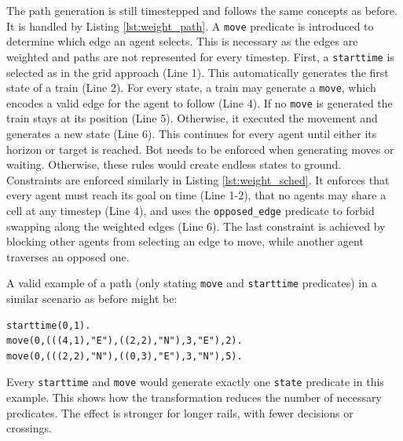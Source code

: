 \documentclass{llncs}
\begin{document}
\begin{multicols*}{2}
The path generation is still timestepped and follows the same concepts as before. It is handled by Listing \ref{lst:weight_path}. A \texttt{move} predicate is introduced to determine which edge an agent selects. This is necessary as the edges are weighted and paths are not represented for every timestep. First, a \texttt{starttime} is selected as in the grid approach (Line 1). This automatically generates the first state of a train (Line 2). For every state, a train may generate a \texttt{move}, which encodes a valid edge for the agent to follow (Line 4). If no \texttt{move} is generated the train stays at its position (Line 5). Otherwise, it executed the movement and generates a new state (Line 6). This continues for every agent until either its horizon or target is reached. Bot needs to be enforced when generating moves or waiting. Otherwise, these rules would create endless states to ground.\\

Constraints are enforced similarly in Listing \ref{lst:weight_sched}. It enforces that every agent must reach its goal on time (Line 1-2), that no agents may share a cell at any timestep (Line 4), and uses the \texttt{opposed\_edge} predicate to forbid swapping along the weighted edges (Line 6). The last constraint is achieved by blocking other agents from selecting an edge to move, while another agent traverses an opposed one.

A valid example of a path (only stating \texttt{move} and \texttt{starttime} predicates) in a similar scenario as before might be:

\begin{verbatim}
starttime(0,1).
move(0,(((4,1),"E"),((2,2),"N"),3,"E"),2).
move(0,(((2,2),"N"),((0,3),"E"),3,"N"),5).
\end{verbatim}

\begin{figure}[b]
    
\end{figure}
\begin{figure}[t]
    
\end{figure}

Every \texttt{starttime} and \texttt{move} would generate exactly one \texttt{state} predicate in this example. This shows how the transformation reduces the number of necessary predicates. The effect is stronger for longer rails, with fewer decisions or crossings.\\


\end{multicols*}
\end{document}
